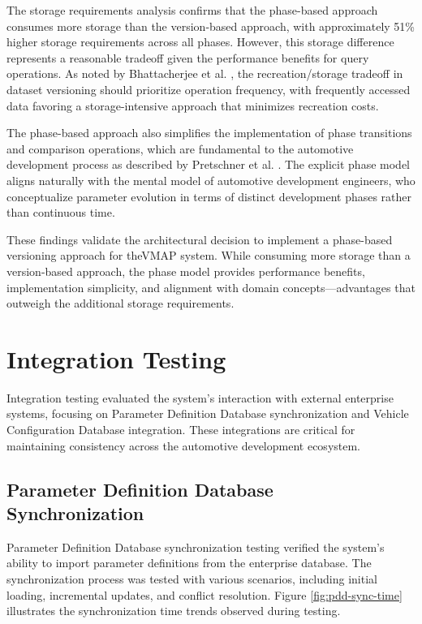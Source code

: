 The storage requirements analysis confirms that the phase-based approach consumes more storage than the version-based approach, with approximately 51\% higher storage requirements across all phases. However, this storage difference represents a reasonable tradeoff given the performance benefits for query operations. As noted by Bhattacherjee et al. \cite{bhattacherjee2015principles}, the recreation/storage tradeoff in dataset versioning should prioritize operation frequency, with frequently accessed data favoring a storage-intensive approach that minimizes recreation costs.

The phase-based approach also simplifies the implementation of phase transitions and comparison operations, which are fundamental to the automotive development process as described by Pretschner et al. \cite{pretschner2007software}. The explicit phase model aligns naturally with the mental model of automotive development engineers, who conceptualize parameter evolution in terms of distinct development phases rather than continuous time.

These findings validate the architectural decision to implement a phase-based versioning approach for the\ac{VMAP} system. While consuming more storage than a version-based approach, the phase model provides performance benefits, implementation simplicity, and alignment with domain concepts—advantages that outweigh the additional storage requirements.

\section{Integration Testing}
\label{sec:integration-testing}

Integration testing evaluated the system's interaction with external enterprise systems, focusing on Parameter Definition Database synchronization and Vehicle Configuration Database integration. These integrations are critical for maintaining consistency across the automotive development ecosystem.

\subsection{Parameter Definition Database Synchronization}
\label{subsec:pdd-synchronization-testing}

Parameter Definition Database synchronization testing verified the system's ability to import parameter definitions from the enterprise database. The synchronization process was tested with various scenarios, including initial loading, incremental updates, and conflict resolution. Figure \ref{fig:pdd-sync-time} illustrates the synchronization time trends observed during testing.

